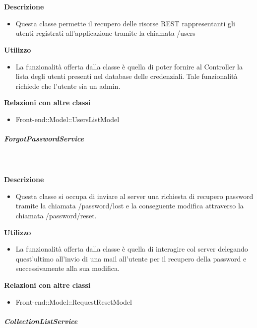 				\textbf{\\ \\ Descrizione} 
					\begin{itemize}
						\item[] Questa classe permette il recupero delle risorse REST rappresentanti gli utenti registrati all'applicazione tramite la chiamata /users
					\end{itemize}      
				\textbf{Utilizzo}  
					\begin{itemize}
						\item[] La funzionalità offerta dalla classe è quella di poter fornire al Controller la lista degli utenti presenti nel database delle credenziali.
Tale funzionalità richiede che l'utente sia un admin.
					\end{itemize}
					\textbf{Relazioni con altre classi}
					\begin{itemize}
							\item{Front-end::Model::UsersListModel}
					\end{itemize}
			\subparagraph{ForgotPasswordService}
				
				\textbf{\\ \\ Descrizione} 
					\begin{itemize}
						\item[] Questa classe si occupa di inviare al server una richiesta di recupero password tramite la chiamata /password/lost e la conseguente modifica attraverso la chiamata /password/reset.
					\end{itemize}      
				\textbf{Utilizzo}  
					\begin{itemize}
						\item[] La  funzionalità offerta dalla classe è quella di interagire col server delegando quest'ultimo all'invio di una mail all'utente per il recupero della password e successivamente alla sua modifica.
					\end{itemize}
					\textbf{Relazioni con altre classi}
					\begin{itemize}
							\item{Front-end::Model::RequestResetModel}
					\end{itemize}
			\subparagraph{CollectionListService}
				
